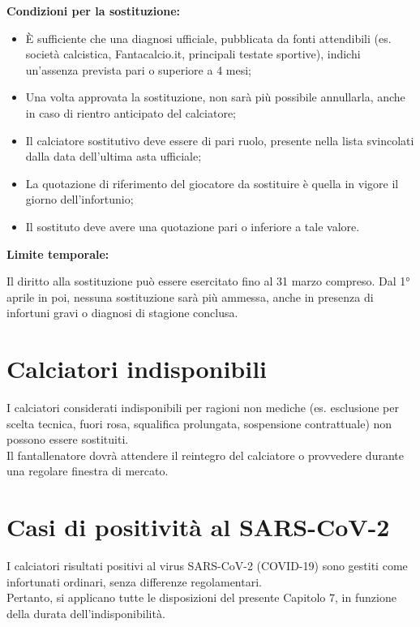 \noindent \textbf{Condizioni per la sostituzione:}
\begin{itemize}
  \item È sufficiente che una diagnosi ufficiale, pubblicata da fonti attendibili (es. società calcistica, Fantacalcio.it, principali testate sportive), indichi un’assenza prevista pari o superiore a 4 mesi;
  \item Una volta approvata la sostituzione, non sarà più possibile annullarla, anche in caso di rientro anticipato del calciatore;
  \item Il calciatore sostitutivo deve essere di pari ruolo, presente nella lista svincolati dalla data dell’ultima asta ufficiale;
  \item La quotazione di riferimento del giocatore da sostituire è quella in vigore il giorno dell’infortunio;
  \item Il sostituto deve avere una quotazione pari o inferiore a tale valore.
\end{itemize}

\noindent  \textbf{Limite temporale:}

Il diritto alla sostituzione può essere esercitato fino al 31 marzo compreso. Dal 1° aprile in poi, nessuna sostituzione sarà più ammessa, anche in presenza di infortuni gravi o diagnosi di stagione conclusa.

\section{Calciatori indisponibili}
\label{art:6.4}

I calciatori considerati indisponibili per ragioni non mediche (es. esclusione per scelta tecnica, fuori rosa, squalifica prolungata, sospensione contrattuale) non possono essere sostituiti.\\
Il fantallenatore dovrà attendere il reintegro del calciatore o provvedere durante una regolare finestra di mercato.

\section{Casi di positività al SARS-CoV-2}
\label{art:6.5}

I calciatori risultati positivi al virus SARS-CoV-2 (COVID-19) sono gestiti come infortunati ordinari, senza differenze regolamentari.\\
Pertanto, si applicano tutte le disposizioni del presente Capitolo 7, in funzione della durata dell’indisponibilità.



